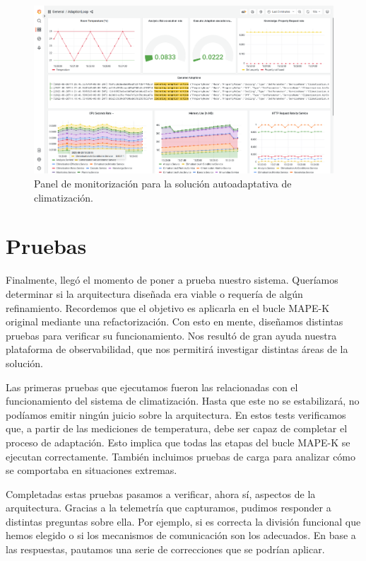 \begin{landscape}

  \begin{figure}[htb]
    \centering
    \includegraphics[scale=0.37]{cap_despliegue/images/Grafana-panel-monitorizacion}
    \caption{Panel de monitorización para la solución autoadaptativa de climatización.}
    \label{fig:grafana-panel-monitorizacion}
  \end{figure}

\end{landscape}


\section{Pruebas}

Finalmente, llegó el momento de poner a prueba nuestro sistema. Queríamos determinar si la arquitectura diseñada era viable o requería de algún refinamiento. Recordemos que el objetivo es aplicarla en el bucle MAPE-K  original mediante una refactorización. Con esto en mente, diseñamos distintas pruebas para verificar su funcionamiento. Nos resultó de gran ayuda nuestra plataforma de observabilidad, que nos permitirá investigar distintas áreas de la solución.

Las primeras pruebas que ejecutamos fueron las relacionadas con el funcionamiento del sistema de climatización. Hasta que este no se estabilizará, no podíamos emitir ningún juicio sobre la arquitectura. En estos tests verificamos que, a partir de las mediciones de temperatura, debe ser capaz de completar el proceso de adaptación. Esto implica que todas las etapas del bucle MAPE-K se ejecutan correctamente. También incluimos pruebas de carga para analizar cómo se comportaba en situaciones extremas.

Completadas estas pruebas pasamos a verificar, ahora sí, aspectos de la arquitectura. Gracias a la telemetría que capturamos, pudimos responder a distintas preguntas sobre ella. Por ejemplo, si es correcta la división funcional que hemos elegido o si los mecanismos de comunicación son los adecuados. En base a las respuestas, pautamos una serie de correcciones que se podrían aplicar.


